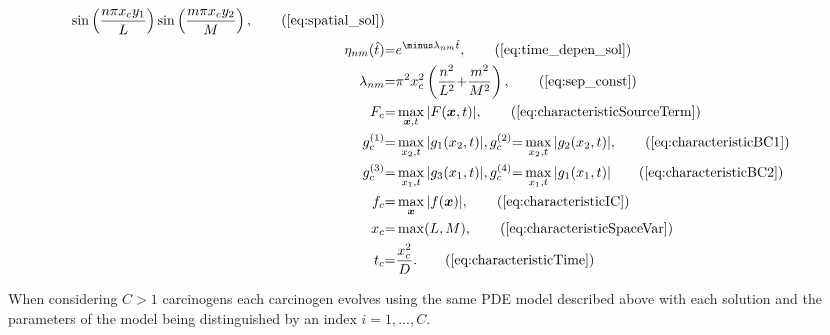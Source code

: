 \documentclass[\main/thesis.tex]{subfiles}
\begin{document}
\begin{align}
	                                                 \sin\left(\frac{n \pi x_c y_1}{L}\right)\sin\left(\frac{m \pi x_c y_2}{M}\right), \tag{\ref{eq:spatial_sol}}\\
\eta_{nm}(\hat{t}) &{=} e^{\minus \lambda_{nm} \hat{t}}, \tag{\ref{eq:time_depen_sol}}\\
\lambda_{nm} &{=} \pi^2 x_c^2 \left(\frac{n^2}{L^2} {+} \frac{m^2}{M^2}\right),
\tag{\ref{eq:sep_const}}\\
F_c &{=} \max_{\boldsymbol{x}, t} | F(\boldsymbol{x}, t) |,
\tag{\ref{eq:characteristicSourceTerm}}\\
g_c^{(1)} &{=} \max_{x_2, t} | g_1(x_2, t) |, g_c^{(2)} {=} \max_{x_2, t} | g_2(x_2, t) |,
\tag{\ref{eq:characteristicBC1}}\\
g_c^{(3)} &{=} \max_{x_1, t} | g_3(x_1, t) |, g_c^{(4)} {=} \max_{x_1, t} | g_1(x_1, t) |
\tag{\ref{eq:characteristicBC2}}\\
f_c &{=} \max_{\boldsymbol{x}} | f(\boldsymbol{x}) |,
\tag{\ref{eq:characteristicIC}}\\
x_c &{=} \max(L, M),
\tag{\ref{eq:characteristicSpaceVar}}\\
t_c &{=} \frac{x_c^2}{D}.
\tag{\ref{eq:characteristicTime}}
\end{align}

When considering $C {>} 1$ carcinogens each carcinogen evolves using the same PDE model described above with each solution and the parameters of the model being distinguished by an index $i {=} 1, ..., C$.
\end{document}

